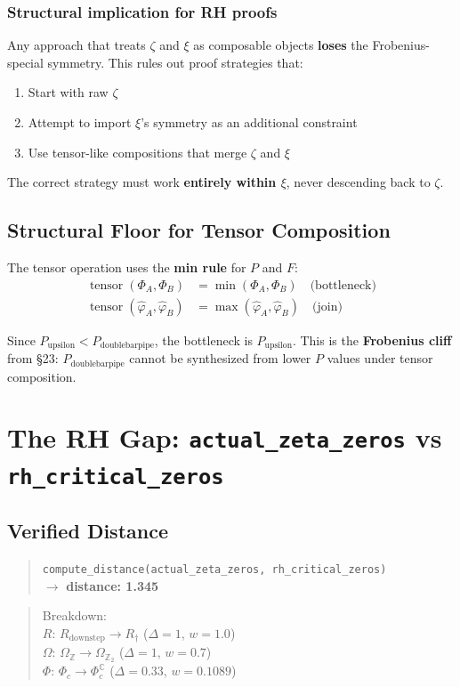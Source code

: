 \documentclass[12pt,oneside]{article}
\theoremstyle{definition}
\theoremstyle{remark}
\newcommand{\Rdownstep}{R_{\text{downstep}}}
\newcommand{\Pdoublebarpipe}{P_{\text{doublebarpipe}}}
\newcommand{\Pupsilon}{P_{\text{upsilon}}}
\newcommand{\OmegaZ}{\Omega_{\mathbb{Z}}}
\newcommand{\OmegaZtwo}{\Omega_{\mathbb{Z}_2}}
\begin{document}
\subsubsection{Structural implication for RH proofs}

Any approach that treats $\zeta$ and $\xi$ as composable objects \textbf{loses} the Frobenius-special symmetry. This rules out proof strategies that:
\begin{enumerate}
\item Start with raw $\zeta$
\item Attempt to import $\xi$'s symmetry as an additional constraint
\item Use tensor-like compositions that merge $\zeta$ and $\xi$
\end{enumerate}

The correct strategy must work \textbf{entirely within $\xi$}, never descending back to $\zeta$.

\subsection{Structural Floor for Tensor Composition}

The tensor operation uses the \textbf{min rule} for $P$ and $F$:
\begin{align}
\operatorname{tensor}(\Phi_A, \Phi_B) &= \min(\Phi_A, \Phi_B) \quad \text{(bottleneck)} \\
\operatorname{tensor}(\hat{\varphi}_A, \hat{\varphi}_B) &= \max(\hat{\varphi}_A, \hat{\varphi}_B) \quad \text{(join)}
\end{align}

Since $\Pupsilon < \Pdoublebarpipe$, the bottleneck is $\Pupsilon$. This is the \textbf{Frobenius cliff} from \S23: $\Pdoublebarpipe$ cannot be synthesized from lower $P$ values under tensor composition.

\section{The RH Gap: \texttt{actual\_zeta\_zeros} vs \texttt{rh\_critical\_zeros}}

\subsection{Verified Distance}

\begin{quote}
\texttt{compute\_distance(actual\_zeta\_zeros, rh\_critical\_zeros)}\\
$\to$ \textbf{distance: 1.345}
\end{quote}
\begin{quote}
Breakdown:\\
\quad $R$: $\Rdownstep \to R_{\dagger}$ ($\Delta = 1$, $w = 1.0$)\\
\quad $\Omega$: $\OmegaZ \to \OmegaZtwo$ ($\Delta = 1$, $w = 0.7$)\\
\quad $\Phi$: $\Phi_c \to \Phi_c^{\mathbb{C}}$ ($\Delta = 0.33$, $w = 0.1089$)
\end{quote}
\end{document}
